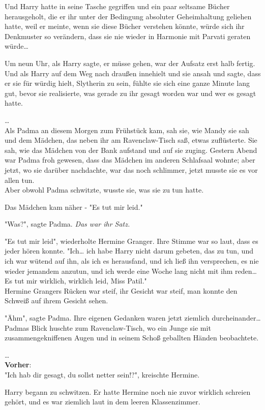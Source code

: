 {Und Harry hatte in seine Tasche gegriffen und ein paar seltsame Bücher herausgeholt, die er ihr unter der Bedingung absoluter Geheimhaltung geliehen hatte, weil er meinte, wenn sie diese Bücher verstehen könnte, würde sich ihr Denkmuster so verändern, dass sie nie wieder in Harmonie mit Parvati geraten würde…

Um neun Uhr, als Harry sagte, er müsse gehen, war der Aufsatz erst halb fertig. Und als Harry auf dem Weg nach draußen innehielt und sie ansah und sagte, dass er sie für würdig hielt, Slytherin zu sein, fühlte sie sich eine ganze Minute lang gut, bevor sie realisierte, was gerade zu ihr gesagt worden war und wer es gesagt hatte.

…\\ Als Padma an diesem Morgen zum Frühstück kam, sah sie, wie Mandy sie sah und dem Mädchen, das neben ihr am Ravenclaw-Tisch saß, etwas zuflüsterte. Sie sah, wie das Mädchen von der Bank aufstand und auf sie zuging. Gestern Abend war Padma froh gewesen, dass das Mädchen im anderen Schlafsaal wohnte; aber jetzt, wo sie darüber nachdachte, war das noch schlimmer, jetzt musste sie es vor allen tun.\\ Aber obwohl Padma schwitzte, wusste sie, was sie zu tun hatte.

Das Mädchen kam näher - "Es tut mir leid."

"Was?", sagte Padma. \emph{Das war ihr Satz.}

"Es tut mir leid", wiederholte Hermine Granger. Ihre Stimme war so laut, dass es jeder hören konnte. "Ich… ich habe Harry nicht darum gebeten, das zu tun, und ich war wütend auf ihn, als ich es herausfand, und ich ließ ihn versprechen, es nie wieder jemandem anzutun, und ich werde eine Woche lang nicht mit ihm reden… Es tut mir wirklich, wirklich leid, Miss Patil."\\ Hermine Grangers Rücken war steif, ihr Gesicht war steif, man konnte den Schweiß auf ihrem Gesicht sehen.

"Ähm", sagte Padma. Ihre eigenen Gedanken waren jetzt ziemlich durcheinander… Padmas Blick huschte zum Ravenclaw-Tisch, wo ein Junge sie mit zusammengekniffenen Augen und in seinem Schoß geballten Händen beobachtete.

…\\ \textbf{Vorher}:\\ "Ich hab dir gesagt, du sollst netter sein!?", kreischte Hermine.

Harry begann zu schwitzen. Er hatte Hermine noch nie zuvor wirklich schreien gehört, und es war ziemlich laut in dem leeren Klassenzimmer.

}
